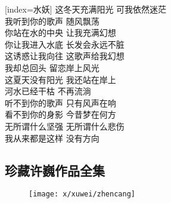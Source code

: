 \begin{songs}{}
  [index={水妖}]
  	这冬天充满阳光 可我依然迷茫		\\
	我听到你的歌声 随风飘荡	\\
	\vspace{2ex}
	你站在水的中央 让我充满幻想	\\
	你让我进入水底 长发会永远不脏	\\
	这诱惑让我向往 这歌声给我幻想	\\
	我却总回头 留恋岸上风光	\\
	\vspace{2ex}
	这夏天没有阳光 我还站在岸上	\\
	河水已经干枯 不再流淌	\\
	听不到你的歌声 只有风声在响	\\
	看不到你的身影 今昔梦在何方	\\
	无所谓什么坚强 无所谓什么悲伤	\\
	我从来都是这样 没有方向	\\
  \endsong
\end{songs}

\subsection{珍藏许巍作品全集}

\begin{figure}[htp]
	\begin{center}
	  \texttt{[image: x/xuwei/zhencang]}
	  \label{fig:xuweizhencang}
	\end{center}
\end{figure}


